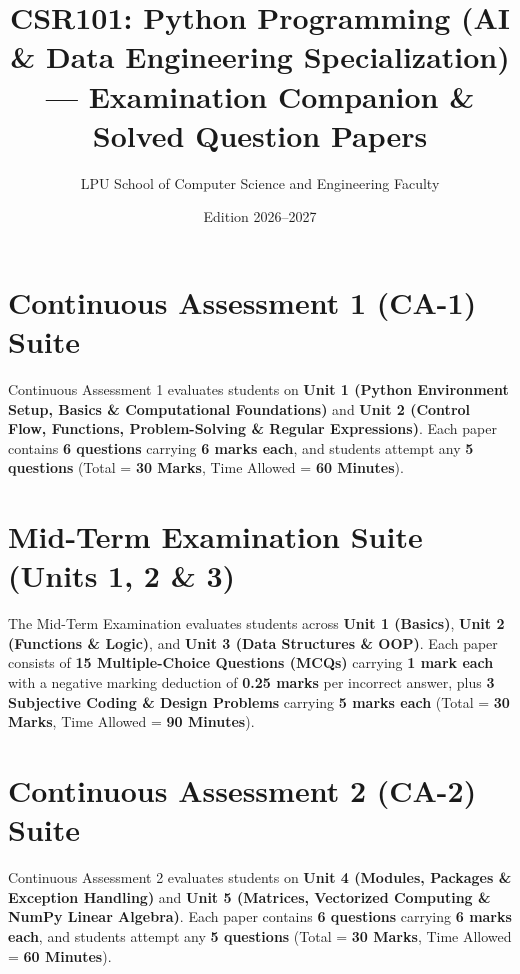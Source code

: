 \documentclass[a4paper,11pt,oneside,openany]{book}
\title{CSR101: Python Programming (AI \& Data Engineering Specialization) --- Examination Companion \& Solved Question Papers}
\author{LPU School of Computer Science and Engineering Faculty}
\date{Edition 2026--2027}
\begin{document}
\frontmatter




\tableofcontents
\newpage

\mainmatter

\chapter{Continuous Assessment 1 (CA-1) Suite}
\label{chap:ca1}
\noindent
Continuous Assessment 1 evaluates students on \textbf{Unit 1 (Python Environment Setup, Basics \& Computational Foundations)} and \textbf{Unit 2 (Control Flow, Functions, Problem-Solving \& Regular Expressions)}. Each paper contains \textbf{6 questions} carrying \textbf{6 marks each}, and students attempt any \textbf{5 questions} (Total = \textbf{30 Marks}, Time Allowed = \textbf{60 Minutes}).

\newpage

\newpage


\chapter{Mid-Term Examination Suite (Units 1, 2 \& 3)}
\label{chap:midterm}
\noindent
The Mid-Term Examination evaluates students across \textbf{Unit 1 (Basics)}, \textbf{Unit 2 (Functions \& Logic)}, and \textbf{Unit 3 (Data Structures \& OOP)}. Each paper consists of \textbf{15 Multiple-Choice Questions (MCQs)} carrying \textbf{1 mark each} with a negative marking deduction of \textbf{0.25 marks} per incorrect answer, plus \textbf{3 Subjective Coding \& Design Problems} carrying \textbf{5 marks each} (Total = \textbf{30 Marks}, Time Allowed = \textbf{90 Minutes}).

\newpage

\newpage


\chapter{Continuous Assessment 2 (CA-2) Suite}
\label{chap:ca2}
\noindent
Continuous Assessment 2 evaluates students on \textbf{Unit 4 (Modules, Packages \& Exception Handling)} and \textbf{Unit 5 (Matrices, Vectorized Computing \& NumPy Linear Algebra)}. Each paper contains \textbf{6 questions} carrying \textbf{6 marks each}, and students attempt any \textbf{5 questions} (Total = \textbf{30 Marks}, Time Allowed = \textbf{60 Minutes}).
\end{document}
